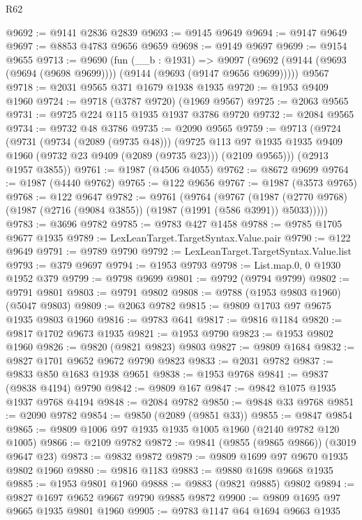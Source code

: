 \begin{lexlean}{R62}
\begin{coremodule}
@9692 := @9141 @2836 @2839
@9693 := @9145 @9649
@9694 := @9147 @9649
@9697 := @8853 @4783 @9656 @9659
@9698 := @9149 @9697
@9699 := @9154 @9655
@9713 := @9690
    (fun (__b : @1931) =>
    @9097 (@9692 (@9144 (@9693 (@9694 (@9698 @9699)))) (@9144 (@9693 (@9147 @9656 @9699)))))
    @9567
@9718 := @2031 @9565 @371 @1679 @1938 @1935
@9720 := @1953 @9409 @1960
@9724 := @9718 (@3787 @9720) (@1969 @9567)
@9725 := @2063 @9565
@9731 := @9725 @224 @115 @1935 @1937 @3786 @9720
@9732 := @2084 @9565
@9734 := @9732 @48 @3786
@9735 := @2090 @9565
@9759 := @9713
    (@9724
      (@9731
        (@9734 (@2089 (@9735 @48)))
        (@9725
          @113
          @97
          @1935
          @1935
          @9409
          @1960
          (@9732 @23 @9409 (@2089 (@9735 @23)))
          (@2109 @9565)))
      (@2913 @1957 @3855))
@9761 := @1987 (@4506 @4055)
@9762 := @8672 @9699
@9764 := @1987 (@4440 @9762)
@9765 := @122 @9656
@9767 := @1987 (@3573 @9765)
@9768 := @122 @9647
@9782 := @9761
    (@9764
      (@9767
        (@1987 (@2770 @9768) (@1987 (@2716 (@9084 @3855)) (@1987 (@1991 (@586 @3991)) @5033)))))
@9783 := @3696 @9782
@9785 := @9783 @427 @1458
@9788 := @9785 @1705 @9677 @1935
@9789 := LexLeanTarget.TargetSyntax.Value.pair
@9790 := @122 @9649
@9791 := @9789 @9790
@9792 := LexLeanTarget.TargetSyntax.Value.list
@9793 := @379 @9697
@9794 := @1953 @9793
@9798 := List.map.{0, 0} @1930 @1952 @379
@9799 := @9798 @9699
@9801 := @9792 (@9794 @9799)
@9802 := @9791 @9801
@9803 := @9791 @9802
@9808 := @9788 (@1953 @9803 @1960) (@5047 @9803)
@9809 := @2063 @9782
@9815 := @9809 @1703 @97 @9675 @1935 @9803 @1960
@9816 := @9783 @641
@9817 := @9816 @1184
@9820 := @9817 @1702 @9673 @1935
@9821 := @1953 @9790
@9823 := @1953 @9802 @1960
@9826 := @9820 (@9821 @9823) @9803
@9827 := @9809 @1684
@9832 := @9827 @1701 @9652 @9672 @9790 @9823
@9833 := @2031 @9782
@9837 := @9833 @850 @1683 @1938 @9651
@9838 := @1953 @9768
@9841 := @9837 (@9838 @4194) @9790
@9842 := @9809 @167
@9847 := @9842 @1075 @1935 @1937 @9768 @4194
@9848 := @2084 @9782
@9850 := @9848 @33 @9768
@9851 := @2090 @9782
@9854 := @9850 (@2089 (@9851 @33))
@9855 := @9847 @9854
@9865 := @9809 @1006 @97 @1935 @1935 @1005 @1960 (@2140 @9782 @120 @1005)
@9866 := @2109 @9782
@9872 := @9841 (@9855 (@9865 @9866)) (@3019 @9647 @23)
@9873 := @9832 @9872
@9879 := @9809 @1699 @97 @9670 @1935 @9802 @1960
@9880 := @9816 @1183
@9883 := @9880 @1698 @9668 @1935
@9885 := @1953 @9801 @1960
@9888 := @9883 (@9821 @9885) @9802
@9894 := @9827 @1697 @9652 @9667 @9790 @9885 @9872
@9900 := @9809 @1695 @97 @9665 @1935 @9801 @1960
@9905 := @9783 @1147 @64 @1694 @9663 @1935

\end{coremodule}
\end{lexlean}
